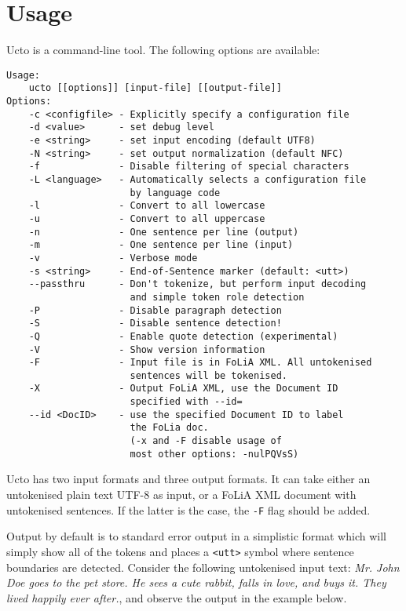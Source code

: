 \documentclass[a4paper,12pt]{report}
\begin{document}
\chapter{Usage}
\label{usage}

Ucto is a command-line tool. The following options are available:

\begin{verbatim}
Usage:
	ucto [[options]] [input-file] [[output-file]]
Options:
	-c <configfile> - Explicitly specify a configuration file
	-d <value>      - set debug level
	-e <string>     - set input encoding (default UTF8)
	-N <string>     - set output normalization (default NFC)
	-f              - Disable filtering of special characters
	-L <language>   - Automatically selects a configuration file
	                  by language code
	-l              - Convert to all lowercase
	-u              - Convert to all uppercase
	-n              - One sentence per line (output)
	-m              - One sentence per line (input)
	-v              - Verbose mode
	-s <string>     - End-of-Sentence marker (default: <utt>)
	--passthru      - Don't tokenize, but perform input decoding
	                  and simple token role detection
	-P              - Disable paragraph detection
	-S              - Disable sentence detection!
	-Q              - Enable quote detection (experimental)
	-V              - Show version information
	-F              - Input file is in FoLiA XML. All untokenised
	                  sentences will be tokenised.
	-X              - Output FoLiA XML, use the Document ID
	                  specified with --id=
	--id <DocID>    - use the specified Document ID to label
	                  the FoLia doc.
	                  (-x and -F disable usage of
	                  most other options: -nulPQVsS)
\end{verbatim}


Ucto has two input formats and three output formats. It can take either an untokenised plain text UTF-8 as input, or a FoLiA XML document with untokenised sentences. If the latter is the case, the \texttt{-F} flag should be added.

Output by default is to standard error output in a simplistic format which will simply show all of the tokens and places a \texttt{<utt>} symbol where sentence boundaries are detected. Consider the following untokenised input text: \emph{Mr. John Doe goes to the pet store. He sees a cute rabbit, falls in love, and buys it. They lived happily ever after.}, and observe the output in the example below.
\end{document}
